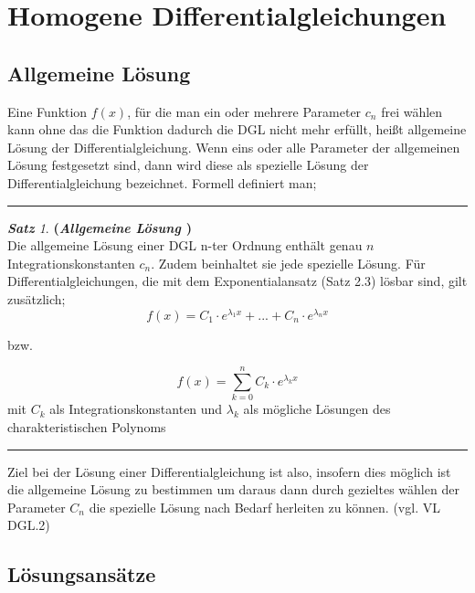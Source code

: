 \documentclass[a4paper,11pt]{article}
\theoremstyle{remark}
\newtheorem{sentence}{\textbf{Satz}}[section]
\begin{document}
\section{Homogene Differentialgleichungen}

\subsection{Allgemeine Lösung}
Eine Funktion $f(x)$, für die man ein oder mehrere Parameter $c_n$ frei wählen kann ohne das die Funktion dadurch die DGL nicht mehr erfüllt, heißt allgemeine Lösung der Differentialgleichung. Wenn eins oder alle Parameter der allgemeinen Lösung festgesetzt sind, dann wird diese als spezielle Lösung der Differentialgleichung bezeichnet. Formell definiert man;
\begin{center}
\begin{flushleft}
\rule{8cm}{0,01cm}
\end{flushleft}
\begin{sentence}{\textbf{(\textit{Allgemeine Lösung \cite{2}})}} \\ Die allgemeine Lösung einer DGL n-ter Ordnung enthält genau $n$ Integrationskonstanten $c_n$. Zudem beinhaltet sie jede spezielle Lösung. Für Differentialgleichungen, die mit dem Exponentialansatz (Satz 2.3) lösbar sind, gilt zusätzlich;
\begin{equation}
f(x)=C_1\cdot e^{\lambda _1x}+...+C_n\cdot e^{\lambda _nx}
\end{equation}
\begin{center}
bzw.
\end{center}
\begin{equation}
f(x)=\sum_{k=0}^n C_k\cdot e^{\lambda _kx}
\end{equation}
mit $C_k$ als Integrationskonstanten und $\lambda_k$ als mögliche Lösungen des charakteristischen Polynoms 
\end{sentence}
\begin{flushleft}
\rule{8cm}{0,01cm}
\end{flushleft}
\end{center}
Ziel bei der Lösung einer Differentialgleichung ist also, insofern dies möglich ist die allgemeine Lösung zu bestimmen um daraus dann durch gezieltes wählen der Parameter $C_n$ die spezielle Lösung nach Bedarf herleiten zu können. (vgl. VL DGL.2)
\subsection{Lösungsansätze}
\end{document}
